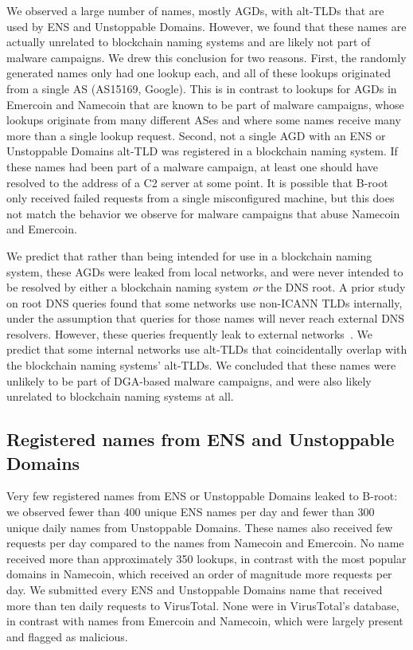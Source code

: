 We observed a large number of names, mostly AGDs, with alt-TLDs that are used 
by ENS and Unstoppable Domains. However, we found that these names are actually 
unrelated to blockchain naming systems and are likely not part of malware 
campaigns. We drew this conclusion for two reasons. First, the randomly 
generated names
only had one lookup each, and all of these lookups originated from a single AS 
(AS15169, Google). This is in contrast to lookups for AGDs in Emercoin and 
Namecoin that are known to be part of malware campaigns, whose lookups 
originate from many different ASes and where some names receive many more than 
a single lookup request. Second, not a single AGD with an ENS or Unstoppable 
Domains alt-TLD was registered in a blockchain naming system. If these names 
had been part of a malware campaign, at least one should have resolved to the 
address of a C2 server at some point. It is possible that B-root only received 
failed requests from a single misconfigured machine, but this does not match 
the behavior we observe for malware campaigns that abuse Namecoin and Emercoin.

We predict that rather than being intended for use in a blockchain naming 
system, these AGDs were leaked from local networks, and were never intended to 
be resolved by either a blockchain naming system \emph{or} the DNS root. A 
prior study on root DNS queries 
found that some networks use non-ICANN TLDs internally, under the assumption 
that queries for those names will never reach external DNS resolvers. However, 
these queries frequently leak to external networks~\cite{chen_wpad_2016}. We 
predict that some internal networks use alt-TLDs that coincidentally overlap 
with the blockchain naming systems' alt-TLDs. We concluded that these names 
were unlikely to be part of DGA-based malware campaigns, and were also likely 
unrelated to blockchain naming systems at all.

\subsection{Registered names from ENS and Unstoppable Domains}

Very few registered names from ENS or Unstoppable Domains leaked to B-root: we 
observed 
fewer than 400 unique ENS names per day and fewer than 300 unique daily names 
from Unstoppable Domains. These names also received few requests per day 
compared to the names from Namecoin and Emercoin. No name received more than 
approximately 350 lookups, %
in contrast with the most popular domains in 
Namecoin, which received an order of magnitude more requests per day. 
We submitted every ENS and Unstoppable Domains name that received more than ten 
daily requests to VirusTotal. None were in VirusTotal's database, in contrast 
with names from Emercoin and Namecoin, which were largely present and flagged 
as malicious.

